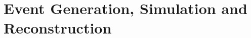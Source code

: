 \chapter{Event Generation, Simulation and Reconstruction}
\label{chap:Reconstruction}
\begin{comment}
\section{Computing and Software Tools}

\subsection{Analysis Software}

\subsection{Monte Carlo Event Generators and Simulation Software}


\end{comment}
